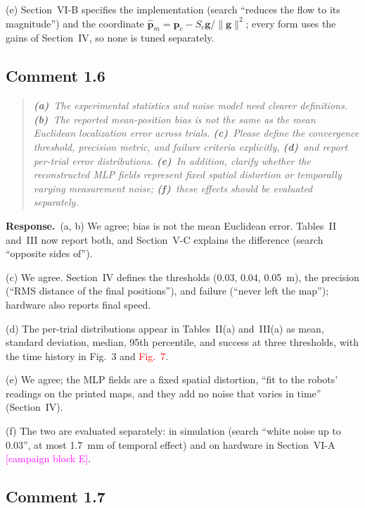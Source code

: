 \documentclass[10pt]{article}
\newcommand{\syn}[1]{\textcolor{red}{#1}}            %
\newcommand{\rev}[1]{#1}                             %
\newcommand{\open}[1]{\textcolor{magenta}{[#1]}}     %
\newcommand{\resp}{\par\textbf{Response.}~}
\begin{document}
(e) Section~VI-B specifies the implementation (search ``reduces the flow to its magnitude'') and the coordinate $\hat{\mathbf{p}}_m = \mathbf{p}_c - S_c\mathbf{g}/\|\mathbf{g}\|^2$; every form uses the gains of Section~IV, so none is tuned separately.

\subsection*{Comment 1.6}

\begin{quote}\itshape
\textbf{(a)}~The experimental statistics and noise model need clearer definitions.
\textbf{(b)}~The reported mean-position bias is not the same as the mean Euclidean localization error across trials.
\textbf{(c)}~Please define the convergence threshold, precision metric, and failure criteria explicitly,
\textbf{(d)}~and report per-trial error distributions.
\textbf{(e)}~In addition, clarify whether the reconstructed MLP fields represent fixed spatial distortion or temporally varying measurement noise;
\textbf{(f)}~these effects should be evaluated separately.
\end{quote}

\resp (a, b) We agree; bias is not the mean Euclidean error. Tables~II and~III now report both, and Section~V-C explains the difference (search ``opposite sides of'').

(c) We agree. Section~IV defines the thresholds (0.03, 0.04, 0.05~m), the precision (``RMS distance of the final positions''), and failure (``never left the map''); hardware also reports final speed.

(d) The per-trial distributions appear in Tables~II(a) and~III(a) as mean, standard deviation, median, 95th percentile, and success at three thresholds, with the time history in Fig.~3 and \syn{Fig.~7}.

(e) We agree; the MLP fields are a fixed spatial distortion, ``fit to the robots' readings on the printed maps, and they add no noise that varies in time'' (Section~IV).

(f) The two are evaluated separately: in simulation (search ``white noise up to 0.03'', at most \rev{1.7}~mm of temporal effect) and on hardware in Section~VI-A \open{campaign block E}.

\subsection*{Comment 1.7}
\end{document}
